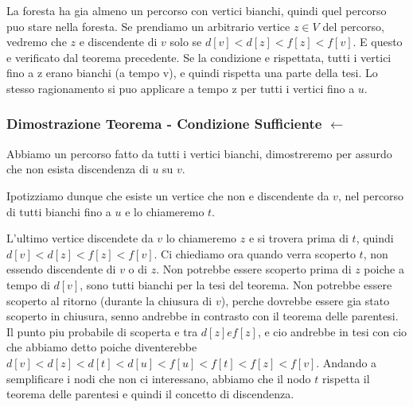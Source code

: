 La foresta ha gia almeno un percorso con vertici bianchi, quindi quel percorso puo stare nella foresta.
Se prendiamo un arbitrario vertice $z \in V$ del percorso, vedremo che $z$ e discendente di $v$ solo se $d[v] < d[z] < f[z] < f[v]$. E questo e verificato dal teorema precedente. Se la condizione e rispettata, tutti i vertici fino a z erano bianchi (a tempo v), e quindi rispetta una parte della tesi. Lo stesso ragionamento si puo applicare a tempo z per tutti i vertici fino a $u$.

\subsubsection{Dimostrazione Teorema - Condizione Sufficiente $\leftarrow$}

Abbiamo un percorso fatto da tutti i vertici bianchi, dimostreremo per assurdo che non esista discendenza di $u$ su $v$.

Ipotizziamo dunque che esiste un vertice che non e discendente da $v$, nel percorso di tutti  bianchi fino a $u$ e lo chiameremo $t$.

L'ultimo vertice discendete da $v$ lo chiameremo $z$ e si trovera prima di $t$, quindi $d[v] < d[z] < f[z] < f[v]$. Ci chiediamo ora quando verra scoperto $t$, non essendo discendente di $v$ o di $z$. Non potrebbe essere scoperto prima di $z$ poiche a tempo di $d[v]$, sono tutti bianchi per la tesi del teorema. Non potrebbe essere scoperto al ritorno (durante la chiusura di $v$), perche dovrebbe essere gia stato scoperto in chiusura, senno andrebbe in contrasto con il teorema delle parentesi.
Il punto piu probabile di scoperta e tra $d[z] e f[z]$, e cio andrebbe in tesi con cio che abbiamo detto poiche diventerebbe $d[v] < d[z] < d[t] < d[u] < f[u] < f[t] < f[z] < f[v]$. Andando a semplificare i nodi che non ci interessano, abbiamo che il nodo $t$ rispetta il teorema delle parentesi e quindi il concetto di discendenza.

